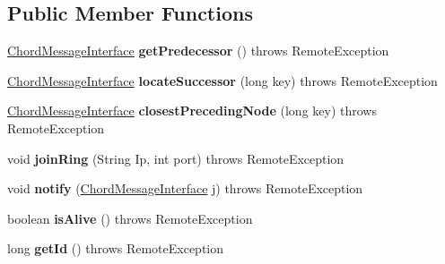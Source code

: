 \subsection*{Public Member Functions}
\begin{DoxyCompactItemize}
\item 
\mbox{\label{interface_chord_message_interface_ab07c08ba6088ef880eaf4ebae8281c51}} 
\mbox{\hyperlink{interface_chord_message_interface}{Chord\+Message\+Interface}} {\bfseries get\+Predecessor} ()  throws Remote\+Exception
\item 
\mbox{\label{interface_chord_message_interface_ab7df61ab2cfee0f39206014d7a42b063}} 
\mbox{\hyperlink{interface_chord_message_interface}{Chord\+Message\+Interface}} {\bfseries locate\+Successor} (long key)  throws Remote\+Exception
\item 
\mbox{\label{interface_chord_message_interface_a1d54a4ccd64382455af7dccfd0d6f95f}} 
\mbox{\hyperlink{interface_chord_message_interface}{Chord\+Message\+Interface}} {\bfseries closest\+Preceding\+Node} (long key)  throws Remote\+Exception
\item 
\mbox{\label{interface_chord_message_interface_abc5a9483416a6b8ae7330b324869e236}} 
void {\bfseries join\+Ring} (String Ip, int port)  throws Remote\+Exception
\item 
\mbox{\label{interface_chord_message_interface_abbb77f94541073d79284d35f970e0eb4}} 
void {\bfseries notify} (\mbox{\hyperlink{interface_chord_message_interface}{Chord\+Message\+Interface}} j)  throws Remote\+Exception
\item 
\mbox{\label{interface_chord_message_interface_a8165b3fb53905e657c70b66223197561}} 
boolean {\bfseries is\+Alive} ()  throws Remote\+Exception
\item 
\mbox{\label{interface_chord_message_interface_aaa28e7b91333c557955404ee8d26d65a}} 
long {\bfseries get\+Id} ()  throws Remote\+Exception
\item 
\mbox{\label{interface_chord_message_interface_af5cff344c9615be675532d192793e9fd}} 

\end{DoxyCompactItemize}
